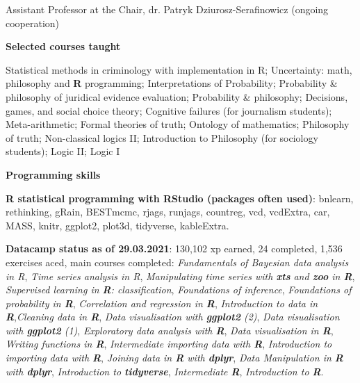 \documentclass[10pt, a4paper]{article}
\newcommand{\years}[1]{\marginnote{\normalsize #1}}
\begin{document}
\years{2017-  } Assistant Professor at the Chair, dr. Patryk Dziurosz-Serafinowicz (ongoing cooperation)


\vspace{2mm}




\large
 {\sc \textbf{Selected courses taught}}
\normalsize

Statistical methods in criminology with implementation in \textsf{R}; Uncertainty: math, philosophy and \textbf{\textsf{R}} programming; Interpretations of Probability; Probability \& philosophy of juridical evidence evaluation; Probability \& philosophy; Decisions, games, and social choice theory; Cognitive failures (for journalism students); Meta-arithmetic; Formal theories of truth; Ontology of mathematics; Philosophy of truth; Non-classical logics II; Introduction to Philosophy (for sociology students); Logic II; Logic I






\vspace{2mm}





\large
 {\sc \textbf{Programming skills}}
\normalsize

\textbf{\textsf{R} statistical programming with \textsf{RStudio} (packages often used)}: \textsf{bnlearn, rethinking, gRain, BESTmcmc, rjags, runjags, countreg,  vcd, vcdExtra, car, MASS, knitr, ggplot2,  plot3d, tidyverse, kableExtra.}

\textbf{Datacamp status as of 29.03.2021}:   130,102 xp earned, 24 completed, 1,536 exercises aced, main courses completed: \emph{Fundamentals of Bayesian data analysis in R}, \emph{Time series analysis in R}, \emph{Manipulating time series with \textsf{\textbf{xts}} and \textsf{\textbf{zoo}} in \textsf{\textbf{R}}}, 
\emph{Supervised learning in \textsf{\textbf{R}}: classification}, \emph{Foundations of inference}, \emph{Foundations of probability in \textsf{\textbf{R}}},  
\emph{Correlation and regression in \textsf{\textbf{R}}}, \emph{Introduction to data in \textsf{\textbf{R}}},\emph{Cleaning data in \textsf{\textbf{R}}},
 \emph{Data visualisation with \textsf{\textbf{ggplot2}} (2)},
  \emph{Data visualisation with \textsf{\textbf{ggplot2}} (1)}, \emph{Exploratory data analysis with \textsf{\textbf{R}}},  \emph{Data visualisation in \textsf{\textbf{R}}}, \emph{Writing functions in \textsf{\textbf{R}}}, \emph{Intermediate importing data with \textsf{\textbf{R}}}, \emph{Introduction to importing data with \textsf{\textbf{R}}}, \emph{Joining data in \textsf{\textbf{R}} with \textsf{\textbf{dplyr}}}, \emph{Data Manipulation in \textsf{\textbf{R}} with \textsf{\textbf{dplyr}}}, \emph{Introduction to \textsf{\textbf{tidyverse}}}, \emph{Intermediate \textsf{\textbf{R}}}, \emph{Introduction to \textsf{\textbf{R}}}.
\end{document}
